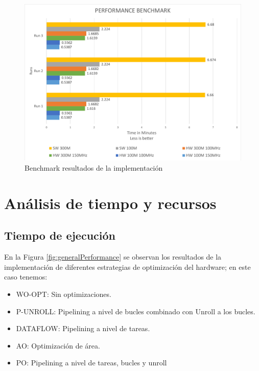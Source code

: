  \begin{figure}[!ht]
	\centering
		\includegraphics[scale=0.6]{Figures/performanceBenchmark}
	\caption{Benchmark resultados de la implementación}
	\label{fig:benchmark}
\end{figure}


\clearpage

\section{Análisis de tiempo y recursos}
\subsection{Tiempo de ejecución}

En la Figura \ref{fig:generalPerformance} se observan los resultados de la implementación de diferentes estrategias de optimización del hardware; en este caso tenemos: 
\begin{itemize}

\item WO-OPT: Sin optimizaciones.

\item P-UNROLL: Pipelining a nivel de bucles combinado con Unroll a los bucles.

\item DATAFLOW: Pipelining a nivel de tareas.

\item AO: Optimización de área.

\item PO: Pipelining a nivel de tareas, bucles y unroll

\end{itemize}

